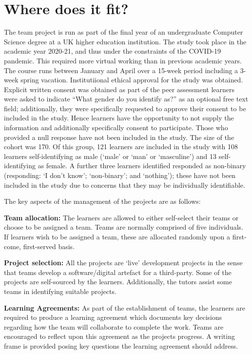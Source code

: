 \documentclass[sigconf, anonymous=true]{acmart}
\begin{document}
\section{Where does it fit?}
The team project is run as part of the final year of an undergraduate
Computer Science degree at a UK higher education institution. The
study took place in the academic year 2020-21, and thus under the
constraints of the COVID-19 pandemic. This required more virtual
working than in previous academic years. The course runs between
January and April over a 15-week period including a 3-week spring
vacation. Institutiional ethical approval for the study was
obtained. Explicit written consent was obtained as part of the peer
assessment learners were asked to indicate ``What gender do you
identify as?'' as an optional free text field; additionally, they were
specifically requested to approve their consent to be included in the
study. Hence learners have the opportunity to not supply the
information and additionally specifically consent to
participate. Those who provided a null response have not been included
in the study. The size of the cohort was 170. Of this group, 121
learners are included in the study with 108 learners self-identifying
as male (`male' or `man' or `masculine') and 13 self-identifying as
female. A further three learners identified responded as non-binary
(responding: `I don't know'; `non-binary'; and `nothing'); these have
not been included in the study due to concerns that they may be
individually identifiable.

The key aspects of the management of the projects are as
follows:

    \textbf{Team allocation:}
The learners are allowed to either self-select their teams or choose
to be assigned a team. Teams are normally comprised of five
individuals. If learners wish to be assigned a team, these are
allocated randomly upon a first-come, first-served basis.

\textbf {Project selection:}
All the projects are `live' development projects in the sense that
teams develop a software/digital artefact for a third-party. Some of the
projects are self-sourced by the learners. Additionally, the tutors
assist some teams in identifying suitable projects.

\textbf{Learning Agreements:}
As part of the establishment of teams, the learners are required to
produce a learning agreement which documents key decisions regarding
how the team will collaborate to complete the work. Teams are
encouraged to reflect upon this agreement as the projects progress. A
writing frame is provided posing key questions the learning agreement
should address.
\end{document}

